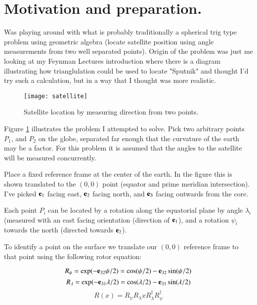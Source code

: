 \documentclass{article}      %
\title{} %
\author{Peeter Joot}         %
\begin{document}

\maketitle{}

\section{ Motivation and preparation. }

Was playing around with what is probably traditionally a spherical trig type problem using geometric algebra (locate satellite position using angle measurements from two well separated points).  Origin of the problem was just me looking at my Feynman Lectures introduction where there is a diagram illustrating how trianglulation could be used to locate "Sputnik" and thought I'd try such a calculation, but in a way that I thought was more realistic.

\begin{figure}[htp]
\centering
\texttt{[image: satellite]}
\caption{Satellite location by measuring direction from two points.}\label{fig:satellite}
\end{figure}

Figure \ref{fig:satellite} illustrates the problem I attempted to solve.  Pick two arbitrary points $P_1$, and $P_2$ on the globe, separated far enough that the curvature of the earth may be a factor.
For this problem it is assumed that the angles to the satellite will be measured concurrently.

Place a fixed reference frame at the center of the earth.  In the figure this is shown translated to the $(0,0)$ point (equator and prime meridian intersection).  I've picked $\mathbf{e}_1$ facing east, $\mathbf{e}_2$ facing north, and $\mathbf{e}_3$ facing outwards from the core.

Each point $P_i$ can be located by a rotation along the equatorial plane by angle $\lambda_i$ (measured with an east facing orientation (direction of $\mathbf{e}_1$), and a rotation $\psi_i$ towards the north (directed towards $\mathbf{e}_2$).

To identify a point on the surface we translate our $(0,0)$ reference frame to that point using the
following rotor equation:

\begin{equation}\label{eqn:northrotor}
R_{\psi} = \exp(-\mathbf{e}_{32}\psi/2) = \cos(\psi/2) - \mathbf{e}_{32}\sin(\psi/2)
\end{equation}
\begin{equation}\label{eqn:eastrotor}
R_{\lambda} = \exp(-\mathbf{e}_{31}\lambda/2) = \cos(\lambda/2) - \mathbf{e}_{31}\sin(\lambda/2)
\end{equation}
\begin{equation}
R(x) = R_{\psi} R_{\lambda} x R_{\lambda}^\dagger R_{\psi}^\dagger
\end{equation}
\end{document}

